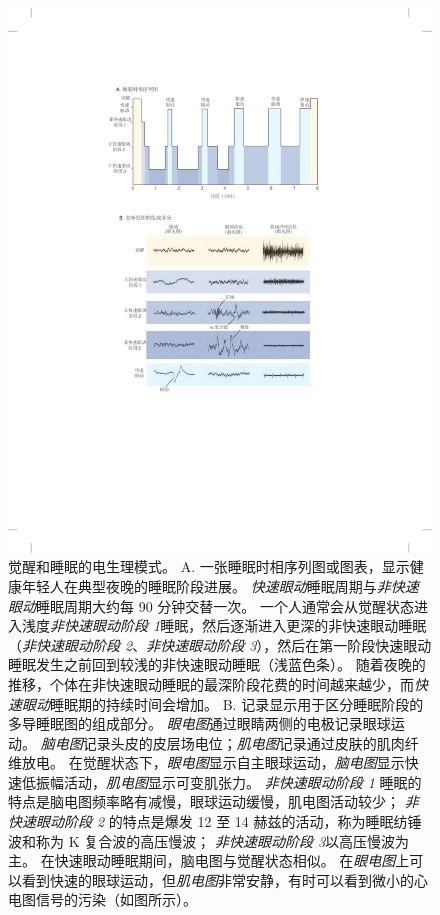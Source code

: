 \begin{figure}[htbp]
	\centering
	\includegraphics[width=0.75\linewidth]{chap44/fig_44_1}
	\caption{觉醒和睡眠的电生理模式。
		A. 一张睡眠时相序列图或图表，显示健康年轻人在典型夜晚的睡眠阶段进展。
		\textit{快速眼动}睡眠周期与\textit{非快速眼动}睡眠周期大约每 90 分钟交替一次。
		一个人通常会从觉醒状态进入浅度\textit{非快速眼动阶段 1}睡眠，然后逐渐进入更深的非快速眼动睡眠（\textit{非快速眼动阶段 2}、\textit{非快速眼动阶段 3}），然后在第一阶段快速眼动睡眠发生之前回到较浅的非快速眼动睡眠（浅蓝色条）。
		随着夜晚的推移，个体在非快速眼动睡眠的最深阶段花费的时间越来越少，而\textit{快速眼动}睡眠期的持续时间会增加。
		B. 记录显示用于区分睡眠阶段的多导睡眠图的组成部分。
		\textit{眼电图}通过眼睛两侧的电极记录眼球运动。
		\textit{脑电图}记录头皮的皮层场电位；\textit{肌电图}记录通过皮肤的肌肉纤维放电。
		在觉醒状态下，\textit{眼电图}显示自主眼球运动，\textit{脑电图}显示快速低振幅活动，\textit{肌电图}显示可变肌张力。
		\textit{非快速眼动阶段 1} 睡眠的特点是脑电图频率略有减慢，眼球运动缓慢，肌电图活动较少；
		\textit{非快速眼动阶段 2} 的特点是爆发 12 至 14 赫兹的活动，称为睡眠纺锤波和称为 K 复合波的高压慢波；
		\textit{非快速眼动阶段 3}以高压慢波为主。
		在快速眼动睡眠期间，脑电图与觉醒状态相似。
		在\textit{眼电图}上可以看到快速的眼球运动，但\textit{肌电图}非常安静，有时可以看到微小的心电图信号的污染（如图所示）。}
	\label{fig:44_1}
\end{figure}


